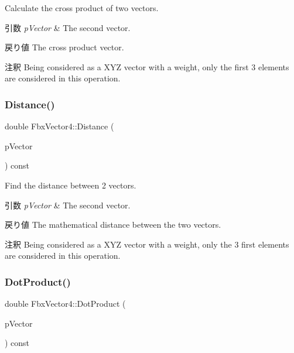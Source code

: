 Calculate the cross product of two vectors. 
\begin{DoxyParams}{引数}
{\em p\+Vector} & The second vector. \\
\hline
\end{DoxyParams}
\begin{DoxyReturn}{戻り値}
The cross product vector. 
\end{DoxyReturn}
\begin{DoxyRemark}{注釈}
Being considered as a X\+YZ vector with a weight, only the first 3 elements are considered in this operation. 
\end{DoxyRemark}
\mbox{\label{class_fbx_vector4_a7d1010f60f73f8bd3668dcf7827421b2}} 
\subsubsection{\texorpdfstring{Distance()}{Distance()}}
{\footnotesize\ttfamily double Fbx\+Vector4\+::\+Distance (\begin{DoxyParamCaption}\item[{const \hyperlink{class_fbx_vector4}{Fbx\+Vector4} \&}]{p\+Vector }\end{DoxyParamCaption}) const}

Find the distance between 2 vectors. 
\begin{DoxyParams}{引数}
{\em p\+Vector} & The second vector. \\
\hline
\end{DoxyParams}
\begin{DoxyReturn}{戻り値}
The mathematical distance between the two vectors. 
\end{DoxyReturn}
\begin{DoxyRemark}{注釈}
Being considered as a X\+YZ vector with a weight, only the 3 first elements are considered in this operation. 
\end{DoxyRemark}
\mbox{\label{class_fbx_vector4_adef4af04dc2011fb6553fad79d445ed0}} 
\subsubsection{\texorpdfstring{Dot\+Product()}{DotProduct()}}
{\footnotesize\ttfamily double Fbx\+Vector4\+::\+Dot\+Product (\begin{DoxyParamCaption}\item[{const \hyperlink{class_fbx_vector4}{Fbx\+Vector4} \&}]{p\+Vector }\end{DoxyParamCaption}) const}

